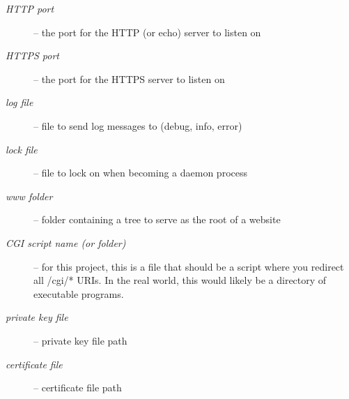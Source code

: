 \begin{description}
	\item[\textnormal{\emph{HTTP port}}] -- the port for the HTTP (or echo) server
                                          to listen on

	\item[\textnormal{\emph{HTTPS port}}] -- the port for the HTTPS server to
                                           listen on

	\item[\textnormal{\emph{log file}}] -- file to send log messages to
                                         (debug, info, error)

	\item[\textnormal{\emph{lock file}}] -- file to lock on when becoming a daemon
                                          process

	\item[\textnormal{\emph{www folder}}] -- folder containing a tree to serve as
                                           the root of a website

	\item[\textnormal{\emph{CGI script name (or folder)}}] --
										   for this project, this is a file that should be
										   a script where you redirect all
										   /cgi/* URIs. In the real world, this
										   would likely be a directory of
										   executable programs.

	\item[\textnormal{\emph{private key file}}] -- private key file path

	\item[\textnormal{\emph{certificate file}}] -- certificate file path
\end{description}


